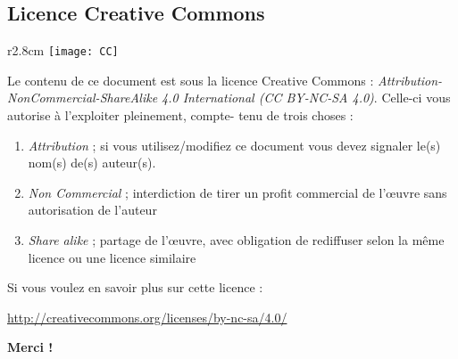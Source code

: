 \subsection*{Licence Creative Commons}
\begin{wrapfigure}[3]{r}{2.8cm}
\texttt{[image: CC]}
\end{wrapfigure}
Le contenu de ce document est sous la licence Creative Commons : \textit{Attribution-NonCommercial-ShareAlike 
4.0 International (CC BY-NC-SA 4.0)}. Celle-ci vous autorise à l'exploiter pleinement, compte-
tenu de trois choses :
\begin{enumerate}
\item \textit{Attribution} ; si vous utilisez/modifiez ce document vous devez signaler le(s) nom(s)
de(s) auteur(s).
\item \textit{Non Commercial} ; interdiction de tirer un profit commercial de l’œuvre sans 
autorisation de l'auteur 
\item \textit{Share alike} ;  partage de l’œuvre, avec obligation de rediffuser selon la même 
licence ou une licence similaire
\end{enumerate}
Si vous voulez en savoir plus sur cette licence :
\begin{center}
\url{http://creativecommons.org/licenses/by-nc-sa/4.0/}
\end{center}

\begin{flushright}
\textbf{Merci ! }
\end{flushright}